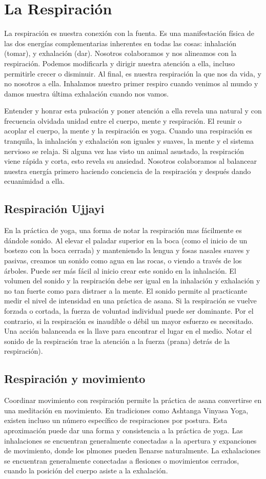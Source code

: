 \section{La Respiración}
La respiración es nuestra conexión con la fuenta. Es una manifestación física de las dos energías complementarias inherentes en todas las cosas: inhalación (tomar), y exhalación (dar). Nosotros colaboramos y nos alineamos con la respiración. Podemos modificarla y dirigir nuestra atención a ella, incluso permitirle crecer o disminuir. Al final, es nuestra respiración la que nos da vida, y no nosotros a ella. Inhalamos nuestro primer respiro cuando venimos al mundo y damos nuestra última exhalación cuando nos vamos.

Entender y honrar esta pulsación y poner atención a ella revela una natural y con frecuencia olvidada unidad entre el cuerpo, mente y respiración. El reunir o acoplar el cuerpo, la mente y la respiración es yoga. Cuando una respiración es tranquila, la inhalación y exhalación son iguales y suaves, la mente y el sistema nervioso se relaja. Si alguna vez has visto un animal asustado, la respiración viene rápida y corta, esto revela su ansiedad. Nosotros colaboramos al balancear nuestra energía primero haciendo conciencia de la respiración y despu\'es dando ecuanimidad a ella.

\subsection{Respiración Ujjayi}
En la práctica de yoga, una forma de notar la respiración mas fácilmente es dándole sonido. Al elevar el paladar superior en la boca (como el inicio de un bostezo con la boca cerrada) y manteniendo la lengua y fosas nasales suaves y pasivas, creamos un sonido como agua en las rocas, o viendo a trav\'es de los árboles. Puede ser más fácil al inicio crear este sonido en la inhalación. El volumen del sonido y la respiración debe ser igual en la inhalación y exhalación y no tan fuerte como para distraer a la mente. El sonido permite al practicante medir el nivel de intensidad en una práctica de asana. Si la respiración se vuelve forzada o cortada, la fuerza de voluntad individual puede ser dominante. Por el contrario, si la respiración es inaudible o d\'ebil un mayor esfuerzo es necesitado. Una acción balanceada es la llave para encontrar el lugar en el medio. Notar el sonido de la respiración trae la atención a la fuerza (prana) detrás de la respiración).

\subsection{Respiración y movimiento}
Coordinar movimiento con respiración permite la práctica de asana convertirse en una meditación en movimiento. En tradiciones como Ashtanga Vinyasa Yoga, existen incluso un número específico de respiraciones por postura. Esta aproximación puede dar una forma y consistencia a la práctica de yoga. Las inhalaciones se encuentran generalmente conectadas a la apertura y expanciones de movimiento, donde los plmones pueden llenarse naturalmente. La exhalaciones se encuentran generalmente conectadas a flesiones o movimientos cerrados, cuando la posición del cuerpo asiste a la exhalación.
 
